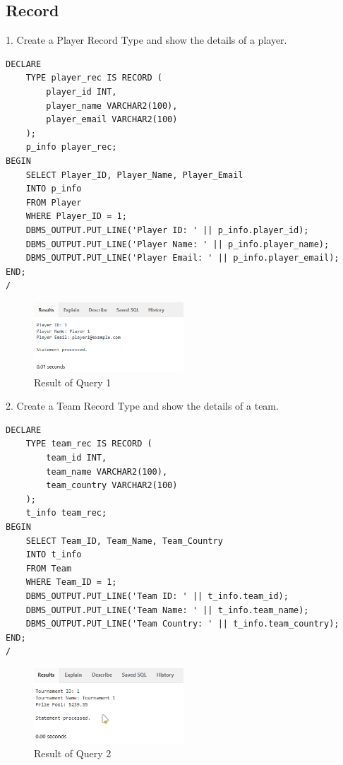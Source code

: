 \clearpage
\subsection{Record}
\hrulefill

1. Create a  Player Record Type and  show the details of a player.

\begin{lstlisting}[caption={ Query 1},label={lst:q-1}]
    DECLARE
    TYPE player_rec IS RECORD (
        player_id INT,
        player_name VARCHAR2(100),
        player_email VARCHAR2(100)
    );
    p_info player_rec;
BEGIN
    SELECT Player_ID, Player_Name, Player_Email
    INTO p_info
    FROM Player
    WHERE Player_ID = 1;
    DBMS_OUTPUT.PUT_LINE('Player ID: ' || p_info.player_id);
    DBMS_OUTPUT.PUT_LINE('Player Name: ' || p_info.player_name);
    DBMS_OUTPUT.PUT_LINE('Player Email: ' || p_info.player_email);
END;
/
\end{lstlisting}
\begin{figure}[H]
    \centering
    \includegraphics[width=0.5\textwidth]{images/plsql/record/Players Record.png}
    \caption{Result of Query 1}
\end{figure}

2. Create a Team Record Type and show the details of a team.
\begin{lstlisting}[caption={ Query 2},label={lst:q-2}]
    DECLARE
    TYPE team_rec IS RECORD (
        team_id INT,
        team_name VARCHAR2(100),
        team_country VARCHAR2(100)
    );
    t_info team_rec;
BEGIN
    SELECT Team_ID, Team_Name, Team_Country
    INTO t_info
    FROM Team
    WHERE Team_ID = 1;
    DBMS_OUTPUT.PUT_LINE('Team ID: ' || t_info.team_id);
    DBMS_OUTPUT.PUT_LINE('Team Name: ' || t_info.team_name);
    DBMS_OUTPUT.PUT_LINE('Team Country: ' || t_info.team_country);
END;
/

\end{lstlisting}
\clearpage
\begin{figure}[H]
    \centering
    \includegraphics[width=0.5\textwidth]{images/plsql/record/Tournament Record Type.png}
    \caption{Result of Query 2}
\end{figure}

